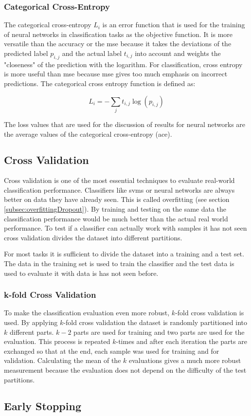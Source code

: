 \subsubsection*{Categorical Cross-Entropy}
The categorical cross-entropy $L_i$ is an error function that is used for the training of neural networks in classification tasks as the objective function. It is more versatile than the accuracy or the \gls{mse} because it takes the deviations of the predicted label $p_{i,j}$ and the actual label $t_{i,j}$ into account and weights the "closeness" of the prediction with the logarithm. For classification, cross entropy is more useful than \gls{mse} because \gls{mse} gives too much emphasis on incorrect predictions. The categorical cross entropy function is defined as:

\begin{equation}
L_i = - \sum_{j} t_{i,j}\log(p_{i,j})
\end{equation} 

The loss values that are used for the discussion of results for neural networks are the average values of the categorical cross-entropy {(\gls{ace})}.

\subsection{Cross Validation}
Cross validation is one of the most essential techniques to evaluate real-world classification performance. Classifiers like \glspl{svm} or neural networks are always better on data they have already seen. This is called overfitting {(see section \ref{subsec:overfittingDropout})}. By training and testing on the same data the classification performance would be much better than the actual real world performance. To test if a classifier can actually work with samples it has not seen cross validation divides the dataset into different partitions. 

For most tasks it is sufficient to divide the dataset into a training and a test set. The data in the training set is used to train the classifier and the test data is used to evaluate it with data is has not seen before.

\subsubsection*{k-fold Cross Validation}
To make the classification evaluation even more robust, $k$-fold cross validation is used. By applying $k$-fold cross validation the dataset is randomly partitioned into $k$ different parts. $k-2$ parts are used for training and two parts are used for the evaluation. This process is repeated $k$-times and after each iteration the parts are exchanged so that at the end, each sample was used for training and for validation. Calculating the mean of the $k$ evaluations gives a much more robust measurement because the evaluation does not depend on the difficulty of the test partitions.

\subsection{Early Stopping}